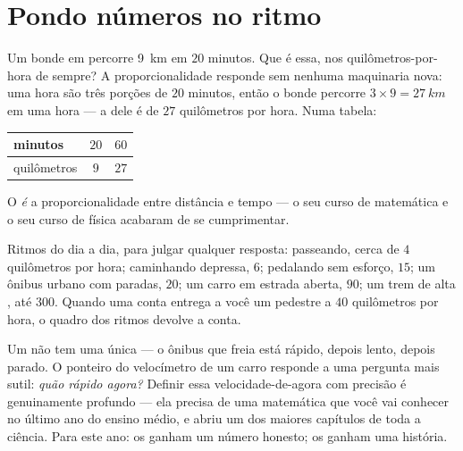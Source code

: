 \section{Pondo números no ritmo}

\begin{example}\label{ex:g6:describing-motion:proportion}
Um bonde em  percorre \qty{9}{km} em $20$ minutos.
Que  é essa, nos quilômetros-por-hora de sempre? A
proporcionalidade responde sem nenhuma maquinaria nova: uma hora são
três porções de $20$ minutos, então o bonde percorre
$3 \times 9 = \qty{27}{km}$ em uma hora --- a  dele é de
$27$ quilômetros por hora. Numa tabela:
\begin{center}
\begin{tabular}{l|cc}
minutos & $20$ & $60$ \\
\hline
quilômetros & $9$ & $27$
\end{tabular}
\end{center}
O  \emph{é} a proporcionalidade entre distância e
tempo --- o seu curso de matemática e o seu curso de física acabaram
de se cumprimentar.
\end{example}

\begin{example}\label{ex:g6:describing-motion:paces}
Ritmos do dia a dia, para julgar qualquer resposta: passeando, cerca
de $4$ quilômetros por hora; caminhando depressa, $6$; pedalando sem
esforço, $15$; um ônibus urbano com paradas, $20$; um carro em
estrada aberta, $90$; um trem de alta , até $300$. Quando
uma conta entrega a você um pedestre a $40$ quilômetros por hora, o
quadro dos ritmos devolve a conta.
\end{example}

\begin{remark}\label{rem:g6:describing-motion:instant}
Um  não tem uma única  --- o ônibus que
freia está rápido, depois lento, depois parado. O ponteiro do
velocímetro de um carro responde a uma pergunta mais sutil:
\emph{quão rápido agora?} Definir essa velocidade-de-agora com
precisão é genuinamente profundo --- ela precisa de uma matemática
que você vai conhecer no último ano do ensino médio, e abriu um dos
maiores capítulos de toda a ciência. Para este ano: os  ganham um número honesto; os  ganham uma
história.
\end{remark}

